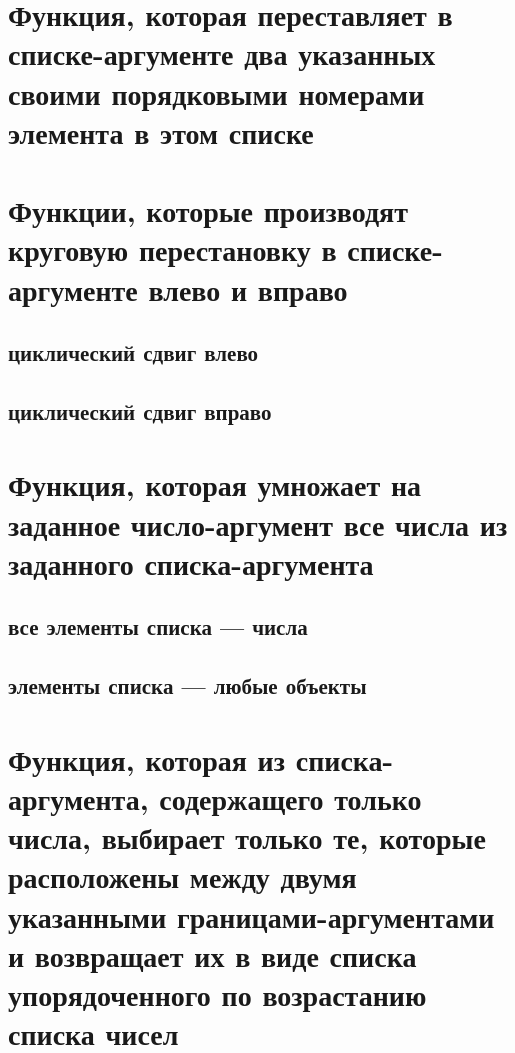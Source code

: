 


\section{Функция, которая переставляет в списке-аргументе два указанных своими порядковыми номерами элемента в этом списке}




\section{Функции, которые производят круговую перестановку в списке-аргументе влево и вправо}

\subsection{циклический сдвиг влево}


\subsection{циклический сдвиг вправо}




\section{Функция, которая умножает на заданное число-аргумент все числа из заданного списка-аргумента}


\subsection{все элементы списка --- числа}


\subsection{элементы списка --- любые объекты}




\section{Функция, которая из списка-аргумента, содержащего только числа, выбирает только те, которые расположены между двумя указанными гра\-ни\-ца\-ми-аргументами и возвращает их в виде списка упорядоченного по возрастанию списка чисел}

